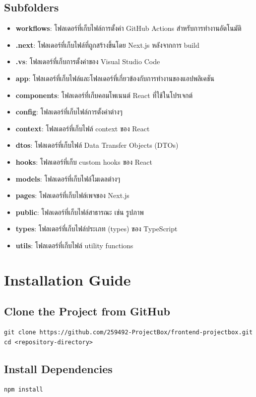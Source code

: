\subsection{Subfolders}
\begin{itemize}
    \item \textbf{workflows}: โฟลเดอร์ที่เก็บไฟล์การตั้งค่า GitHub Actions สำหรับการทำงานอัตโนมัติ
    \item \textbf{.next}: โฟลเดอร์ที่เก็บไฟล์ที่ถูกสร้างขึ้นโดย Next.js หลังจากการ build
    \item \textbf{.vs}: โฟลเดอร์ที่เก็บการตั้งค่าของ Visual Studio Code
    \item \textbf{app}: โฟลเดอร์ที่เก็บไฟล์และโฟลเดอร์ที่เกี่ยวข้องกับการทำงานของแอปพลิเคชัน
    \item \textbf{components}: โฟลเดอร์ที่เก็บคอมโพเนนต์ React ที่ใช้ในโปรเจกต์
    \item \textbf{config}: โฟลเดอร์ที่เก็บไฟล์การตั้งค่าต่างๆ
    \item \textbf{context}: โฟลเดอร์ที่เก็บไฟล์ context ของ React
    \item \textbf{dtos}: โฟลเดอร์ที่เก็บไฟล์ Data Transfer Objects (DTOs)
    \item \textbf{hooks}: โฟลเดอร์ที่เก็บ custom hooks ของ React
    \item \textbf{models}: โฟลเดอร์ที่เก็บไฟล์โมเดลต่างๆ
    \item \textbf{pages}: โฟลเดอร์ที่เก็บไฟล์เพจของ Next.js
    \item \textbf{public}: โฟลเดอร์ที่เก็บไฟล์สาธารณะ เช่น รูปภาพ
    \item \textbf{types}: โฟลเดอร์ที่เก็บไฟล์ประเภท (types) ของ TypeScript
    \item \textbf{utils}: โฟลเดอร์ที่เก็บไฟล์ utility functions
\end{itemize}

\section{Installation Guide}
\subsection{Clone the Project from GitHub}
\begin{verbatim}
git clone https://github.com/259492-ProjectBox/frontend-projectbox.git
cd <repository-directory>
\end{verbatim}

\subsection{Install Dependencies}
\begin{verbatim}
npm install
\end{verbatim}


